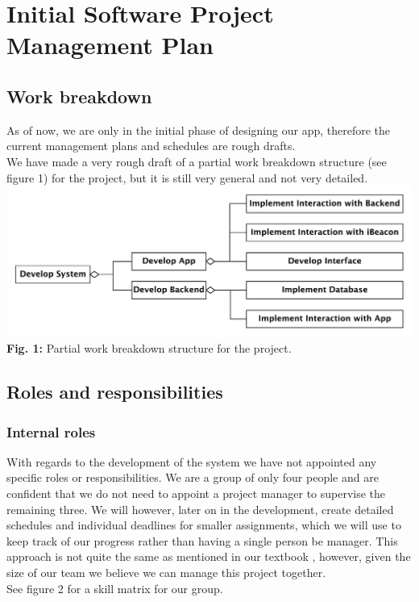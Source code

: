 \documentclass[12pt]{article}
\begin{document}
\section{Initial Software Project Management Plan}

\subsection{Work breakdown}
As of now, we are only in the initial phase of designing our app, therefore the current management plans and schedules are rough drafts.\\
We have made a very rough draft of a partial work breakdown structure (see figure 1) for the project, but it is still very general and not very detailed.\\

\includegraphics[scale=0.6]{work_breakdown}\\
\textbf{Fig. 1:} Partial work breakdown structure for the project.\\



\subsection{Roles and responsibilities}

\subsubsection{Internal roles}
With regards to the development of the system we have not appointed any specific roles or responsibilities. We are a group of only four people and are confident that we do not need to appoint a project manager to supervise the remaining three. We will however, later on in the development, create detailed schedules and individual deadlines for smaller assignments, which we will use to keep track of our progress rather than having a single person be manager. This approach is not quite the same as mentioned in our textbook \cite{OOSE}, however, given the size of our team we believe we can manage this project together.\\
See figure 2 for a skill matrix for our group.\\
\end{document}

